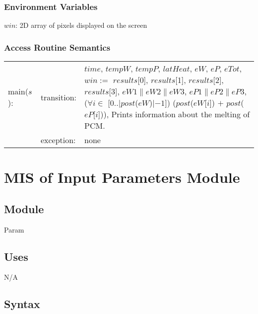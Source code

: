 \documentclass[12pt]{article}
\begin{document}
\subsubsection{Environment Variables}

$win$: 2D array of pixels displayed on the screen

\subsubsection{Access Routine Semantics}

\begin{tabular}{l l p{12cm}}
main($s$): & transition: & $time$, $tempW$, $tempP$, $latHeat$, $eW$, $eP$,
                           $eTot$, $win :=$ $results$[0], $results$[1],
                           $results$[2], $results$[3], $eW1 \| eW2 \| eW3$, $eP1
                           \| eP2 \| eP3$, ($\forall i \in$ [0..$|post$($eW$)$|
                           - 1$]) ($post$($eW$[$i$]) $+$ $post$($eP$[$i$])),
                           Prints information about the melting of PCM. \\
& exception: & none \\
\end{tabular}

\newpage
\section{MIS of Input Parameters Module} \label{Parameters}

\subsection{Module}

Param

\subsection{Uses}

N/A

\subsection{Syntax}


\end{document}
